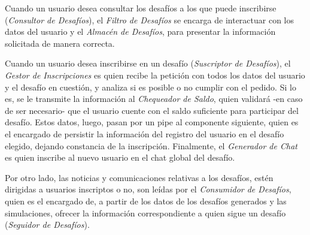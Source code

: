 Cuando un usuario desea consultar los desafíos a los que puede inscribirse (\emph{Consultor de Desafíos}), el \emph{Filtro de Desafíos} se encarga de interactuar con los datos del usuario y el \emph{Almacén de Desafíos}, para presentar la información solicitada de manera correcta.

Cuando un usuario desea inscribirse en un desafío (\emph{Suscriptor de Desafíos}), el \emph{Gestor de Inscripciones} es quien recibe la petición con todos los datos del usuario y el desafío en cuestión, y analiza si es posible o no cumplir con el pedido. Si lo es, se le transmite la información al \emph{Chequeador de Saldo}, quien validará -en caso de ser necesario- que el usuario cuente con el saldo suficiente para participar del desafío. 
Estos datos, luego, pasan por un pipe al componente siguiente, quien es el encargado de persistir la información del registro del usuario en el desafío elegido, dejando constancia de la inscripción.
Finalmente, el \emph{Generador de Chat} es quien inscribe al nuevo usuario en el chat global del desafío.

Por otro lado, las noticias y comunicaciones relativas a los desafíos, estén dirigidas a usuarios inscriptos o no, son leídas por el \emph{Consumidor de Desafíos}, quien es el encargado de, a partir de los datos de los desafíos generados y las simulaciones, ofrecer la información correspondiente a quien sigue un desafío (\emph{Seguidor de Desafíos}).